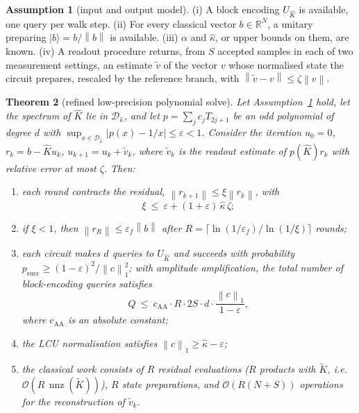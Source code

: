 \documentclass[11pt]{article}
\newtheorem{theorem}{Theorem}[section]
\theoremstyle{definition}
\newtheorem{assumption}[theorem]{Assumption}
\newcommand{\R}{\mathbb{R}}
\newcommand{\norm}[1]{\left\lVert #1 \right\rVert}
\newcommand{\Kt}{\tilde K}
\newcommand{\Kh}{\hat K}
\newcommand{\kh}{\hat\kappa}
\newcommand{\eps}{\varepsilon}
\newcommand{\bigO}{\mathcal{O}}
\newcommand{\nnz}{\operatorname{nnz}}
\begin{document}
\begin{assumption}[input and output model]\label{ass:model}
(i) A block encoding $U_{\Kh}$ is available, one query per walk step. (ii) For every classical vector $b\in\R^{N}$, a unitary preparing $|b\rangle=b/\norm{b}$ is available. (iii) $\alpha$ and $\kh$, or upper bounds on them, are known. (iv) A readout procedure returns, from $S$ accepted samples in each of two measurement settings, an estimate $\tilde v$ of the vector $v$ whose normalised state the circuit prepares, rescaled by the reference branch, with $\norm{\tilde v-v}\le\zeta\norm{v}$.
\end{assumption}

\begin{theorem}[refined low-precision polynomial solve]\label{thm:refine}
Let Assumption~\ref{ass:model} hold, let the spectrum of $\Kh$ lie in $\mathcal D_{\kh}$, and let $p=\sum_jc_jT_{2j+1}$ be an odd polynomial of degree $d$ with $\sup_{x\in\mathcal D_{\kh}}|p(x)-1/x|\le\eps<1$. Consider the iteration $u_0=0$, $r_k=b-\Kh u_k$, $u_{k+1}=u_k+\tilde v_k$, where $\tilde v_k$ is the readout estimate of $p(\Kh)r_k$ with relative error at most $\zeta$. Then:
\begin{enumerate}[label=(\alph*),leftmargin=2em]
\item each round contracts the residual, $\norm{r_{k+1}}\le\xi\norm{r_k}$, with
\begin{equation}\label{eq:contraction}
\xi\ \le\ \eps+(1+\eps)\,\kh\,\zeta;
\end{equation}
\item if $\xi<1$, then $\norm{r_R}\le\eps_f\norm{b}$ after $R=\lceil\ln(1/\eps_f)/\ln(1/\xi)\rceil$ rounds;
\item each circuit makes $d$ queries to $U_{\Kh}$ and succeeds with probability $p_{\text{succ}}\ge(1-\eps)^2/\norm{c}_1^2$; with amplitude amplification, the total number of block-encoding queries satisfies
\begin{equation}\label{eq:queries}
Q\ \le\ c_{\text{AA}}\cdot R\cdot 2S\cdot d\cdot\frac{\norm{c}_1}{1-\eps},
\end{equation}
where $c_{\text{AA}}$ is an absolute constant;
\item the LCU normalisation satisfies $\norm{c}_1\ge\kh-\eps$;
\item the classical work consists of $R$ residual evaluations ($R$ products with $\Kt$, i.e.\ $\bigO(R\,\nnz(\Kt))$), $R$ state preparations, and $\bigO(R(N+S))$ operations for the reconstruction of $\tilde v_k$.
\end{enumerate}
\end{theorem}
\end{document}

